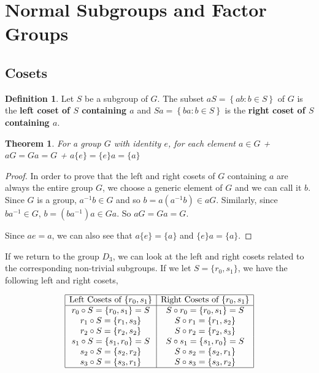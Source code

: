\documentclass[
]{book}
\newtheorem{theorem}{Theorem}[chapter]
\theoremstyle{definition}
\newtheorem{definition}{Definition}[chapter]
\theoremstyle{definition}
\theoremstyle{definition}
\theoremstyle{definition}
\theoremstyle{remark}
\begin{document}
\hypertarget{normal-subgroups-and-factor-groups}{%
\section{Normal Subgroups and Factor Groups}\label{normal-subgroups-and-factor-groups}}

\hypertarget{cosets}{%
\subsection{Cosets}\label{cosets}}

\begin{definition}
Let \(S\) be a subgroup of \(G\). The subset \(aS = \left\{ a b: b\in S \right\}\) of \(G\) is the \textbf{left coset of \(S\) containing \(a\)} and \(Sa = \left\{ ba : b\in S \right\}\) is the \textbf{right coset of \(S\) containing \(a\)}.
\end{definition}

\begin{theorem}
For a group \(G\) with identity \(e\), for each element \(a\in G\)
+ \(aG=Ga=G\)
+ \(a\{e\}=\{e\} a=\{a\}\)
\end{theorem}

\begin{proof}
In order to prove that the left and right cosets of \(G\) containing \(a\) are always the entire group \(G\), we choose a generic element of \(G\) and we can call it \(b\). Since \(G\) is a group, \(a^{-1}b\in G\) and so \(b= a (a^{-1}b) \in aG\). Similarly, since \(ba^{-1}\in G\), \(b = (ba^{-1})a \in Ga\). So \(aG=Ga=G\).

Since \(ae=a\), we can also see that \(a\{e\} = \{a\}\) and \(\{e\}a=\{a\}\).
\end{proof}

If we return to the group \(D_3\), we can look at the left and right cosets related to the corresponding non-trivial subgroups. If we let \(S=\{r_0,s_1\}\), we have the following left and right cosets,

\[\begin{array}{|c|c|}
    \hline
    \mbox{Left Cosets of } \{r_0, s_1\} & \mbox{Right Cosets  of } \{r_0, s_1\}\\ \hline
    r_0 \circ S = \{r_0, s_1\} = S & S \circ r_0 = \{r_0, s_1\} = S \\
     r_1 \circ S = \{r_1, s_3\}  & S \circ r_1 = \{r_1, s_2\}  \\
     r_2 \circ S = \{r_2, s_2 \} & S \circ r_2 = \{r_2, s_3 \} \\
     s_1 \circ S = \{s_1, r_0\}=S & S \circ s_1 = \{s_1, r_0\} = S \\
     s_2 \circ S = \{s_2, r_2 \} & S \circ s_2 = \{s_2, r_1\}  \\
     s_3 \circ S = \{s_3, r_1\} & S \circ s_3 = \{s_3, r_2\}  \\ \hline
\end{array}\]
\end{document}
